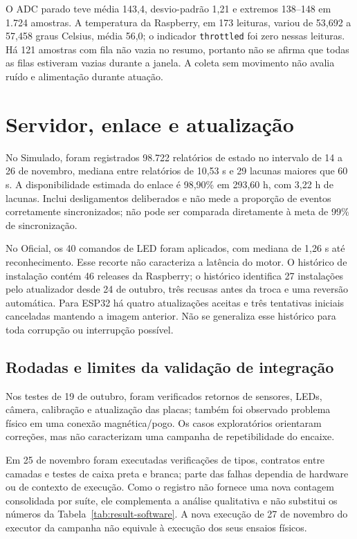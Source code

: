 O ADC parado teve média 143,4, desvio-padrão 1,21 e extremos 138--148 em 1.724 amostras. A temperatura da Raspberry, em 173 leituras, variou de 53,692 a 57,458 graus Celsius, média 56,0; o indicador \texttt{throttled} foi zero nessas leituras. Há 121 amostras com fila não vazia no resumo, portanto não se afirma que todas as filas estiveram vazias durante a janela. A coleta sem movimento não avalia ruído e alimentação durante atuação. 

\section{Servidor, enlace e atualização}
No Simulado, foram registrados 98.722 relatórios de estado no intervalo de 14 a 26 de novembro, mediana entre relatórios de 10,53 s e 29 lacunas maiores que 60 s. A disponibilidade estimada do enlace é 98,90\% em 293,60 h, com 3,22 h de lacunas. Inclui desligamentos deliberados e não mede a proporção de eventos corretamente sincronizados; não pode ser comparada diretamente à meta de 99\% de sincronização. 

No Oficial, os 40 comandos de LED foram aplicados, com mediana de 1,26 s até reconhecimento. Esse recorte não caracteriza a latência do motor. O histórico de instalação contém 46 releases da Raspberry; o histórico identifica 27 instalações pelo atualizador desde 24 de outubro, três recusas antes da troca e uma reversão automática. Para ESP32 há quatro atualizações aceitas e três tentativas iniciais canceladas mantendo a imagem anterior. Não se generaliza esse histórico para toda corrupção ou interrupção possível. 

\subsection{Rodadas e limites da validação de integração}
Nos testes de 19 de outubro, foram verificados retornos de sensores, LEDs, câmera, calibração e atualização das placas; também foi observado problema físico em uma conexão magnética/pogo. Os casos exploratórios orientaram correções, mas não caracterizam uma campanha de repetibilidade do encaixe.

Em 25 de novembro foram executadas verificações de tipos, contratos entre camadas e testes de caixa preta e branca; parte das falhas dependia de hardware ou de contexto de execução. Como o registro não fornece uma nova contagem consolidada por suíte, ele complementa a análise qualitativa e não substitui os números da Tabela~\ref{tab:result-software}. A nova execução de 27 de novembro do executor da campanha não equivale à execução dos seus ensaios físicos.

